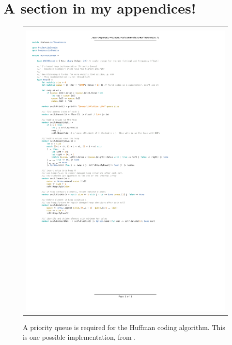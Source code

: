 \documentclass{subfiles}
\begin{document}
\section*{A section in my appendices!}
\begin{figure}[h!]
    \centering
    \begin{tabular}{@{}|c@{}|}
        \hline
        \\\includegraphics[scale=0.70]{images/old/appendix/PQ.pdf}
        \\\hline
    \end{tabular}
    \caption{
        A priority queue is required for the Huffman coding algorithm.
        This is one possible implementation, from \cite{KleTar2006}.
    }
\end{figure}
\end{document}
